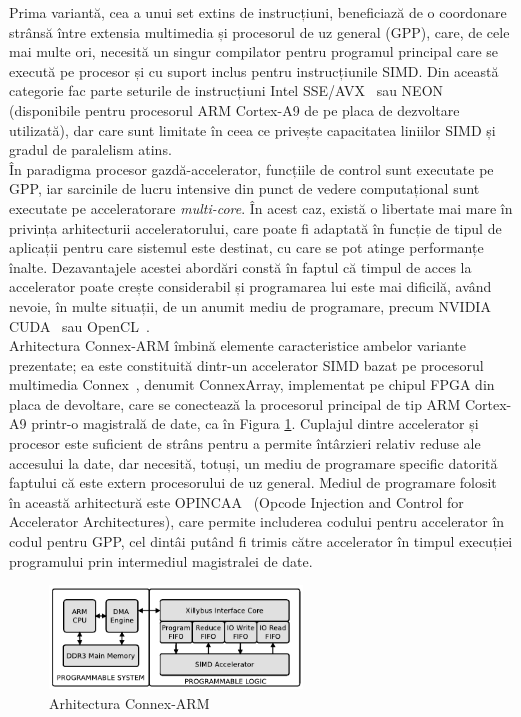 Prima variantă, cea a unui set extins de instrucțiuni, beneficiază de o
coordonare strânsă între extensia multimedia și procesorul de uz general (GPP),
care, de cele mai multe ori, necesită un
singur compilator pentru programul principal care se execută pe procesor și cu
suport inclus pentru instrucțiunile SIMD. Din această categorie fac parte
seturile de instrucțiuni Intel SSE/AVX~\cite{intel-sse-avx} sau
NEON~\cite{arm-neon} (disponibile pentru procesorul ARM Cortex-A9 de pe placa de
dezvoltare utilizată), dar care sunt limitate în ceea ce privește capacitatea
liniilor SIMD și gradul de paralelism atins. \\

În paradigma procesor gazdă-accelerator, funcțiile de control sunt executate pe GPP, iar
sarcinile de lucru intensive din punct de vedere computațional sunt executate pe
acceleratorare \textit{multi-core}. În acest caz, există o libertate mai mare în
privința arhitecturii acceleratorului, care poate fi adaptată în funcție de
tipul de aplicații pentru care sistemul este destinat, cu care se pot atinge
performanțe înalte. Dezavantajele acestei abordări constă în faptul că timpul de
acces la accelerator poate crește considerabil și programarea lui este mai
dificilă, având nevoie, în multe situații, de un anumit mediu de programare,
precum NVIDIA CUDA~\cite{nvidia-cuda} sau OpenCL~\cite{opencl}. \\

Arhitectura Connex-ARM îmbină elemente caracteristice ambelor variante
prezentate; ea este constituită dintr-un accelerator SIMD bazat pe procesorul
multimedia Connex~\cite{stefan2006ca1024}, denumit ConnexArray, implementat pe
chipul FPGA din placa de devoltare, care se conectează la procesorul principal de
tip ARM Cortex-A9 printr-o magistrală de date, ca în Figura
\ref{fig:connex-arm-arch}.  
Cuplajul dintre accelerator și procesor este suficient de strâns pentru a
permite întârzieri relativ reduse ale accesului la date, dar necesită, totuși,
un mediu de programare specific datorită faptului că este extern procesorului de
uz general. Mediul de
programare folosit în această arhitectură este OPINCAA~\cite{opincaa} (Opcode
Injection and Control for Accelerator Architectures), care
permite includerea codului pentru accelerator în codul pentru GPP, cel dintâi
putând fi trimis către accelerator în timpul execuției programului prin intermediul
magistralei de date. \\

\begin{figure}[h]
    \centering
    \includegraphics[width=0.6\textwidth]{src/img/connex-arm-arch}
    \caption{Arhitectura Connex-ARM~\cite{opincaa}}
    \label{fig:connex-arm-arch}
\end{figure}


